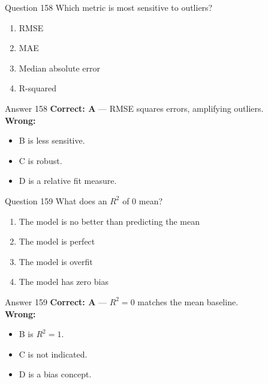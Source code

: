 \documentclass[aspectratio=169,11pt]{beamer}
\begin{document}
	\begin{frame}{Question 158}
		Which metric is most sensitive to outliers?
		\begin{enumerate}[label=\Alph*.]
			\item RMSE
			\item MAE
			\item Median absolute error
			\item R-squared
		\end{enumerate}
	\end{frame}
	\begin{frame}{Answer 158}
		\textbf{Correct: A} --- RMSE squares errors, amplifying outliers.\\
		\vspace{0.5em}
		\textbf{Wrong:}
		\begin{itemize}
			\item B is less sensitive.
			\item C is robust.
			\item D is a relative fit measure.
		\end{itemize}
	\end{frame}
	
	\begin{frame}{Question 159}
		What does an $R^2$ of 0 mean?
		\begin{enumerate}[label=\Alph*.]
			\item The model is no better than predicting the mean
			\item The model is perfect
			\item The model is overfit
			\item The model has zero bias
		\end{enumerate}
	\end{frame}
	\begin{frame}{Answer 159}
		\textbf{Correct: A} --- $R^2=0$ matches the mean baseline.\\
		\vspace{0.5em}
		\textbf{Wrong:}
		\begin{itemize}
			\item B is $R^2=1$.
			\item C is not indicated.
			\item D is a bias concept.
		\end{itemize}
	\end{frame}
	
\end{document}
